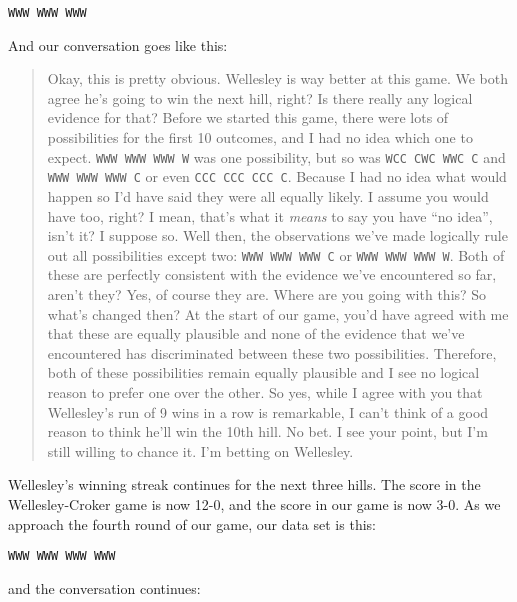 \begin{verbatim}
WWW WWW WWW
\end{verbatim}

\noindent
And our conversation goes like this:

\begin{quote}
\begin{dialogue}
 Okay, this is pretty obvious. Wellesley is way better at this game. We both agree he's going to win the next hill, right?
 Is there really any logical evidence for that? Before we started this game, there were lots of possibilities for the first 10 outcomes, and I had no idea which one to expect. \texttt{WWW WWW WWW W} was one possibility, but so was \texttt{WCC CWC WWC C} and \texttt{WWW WWW WWW C} or even \texttt{CCC CCC CCC C}. Because I had no idea what would happen so I'd have said they were all equally likely. I assume you would have too, right? I mean, that's what it {\it means} to say you have ``no idea'', isn't it?
 I suppose so.
 Well then, the observations we've made logically rule out all possibilities except two: \texttt{WWW WWW WWW C} or \texttt{WWW WWW WWW W}. Both of these are perfectly consistent with the evidence we've encountered so far, aren't they?  
 Yes, of course they are. Where are you going with this?
 So what's changed then? At the start of our game, you'd have agreed with me that these are equally plausible and none of the evidence that we've encountered has discriminated between these two possibilities. Therefore, both of these possibilities remain equally plausible and I see no logical reason to prefer one over the other. So yes, while I agree with you that Wellesley's run of 9 wins in a row is remarkable, I can't think of a good reason to think he'll win the 10th hill. No bet.
 I see your point, but I'm still willing to chance it. I'm betting on Wellesley.
\end{dialogue}
\end{quote}

\noindent
Wellesley's winning streak continues for the next three hills. The score in the Wellesley-Croker game is now 12-0, and the score in our game is now 3-0. As we approach the fourth round of our game, our data set is this:

\begin{verbatim}
WWW WWW WWW WWW
\end{verbatim}

\noindent
and the conversation continues:

